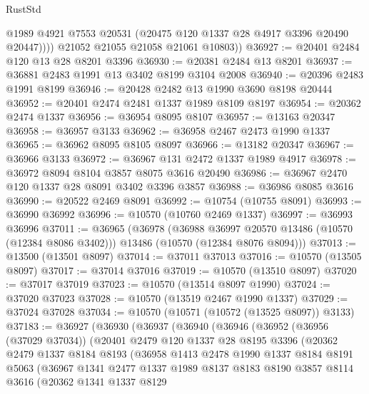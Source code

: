 \begin{lexlean}{RustStd}
\begin{coremodule}
              @1989
              @4921
              @7553
              @20531
              (@20475 @120 @1337 @28 @4917 @3396 @20490 @20447))))
        @21052
        @21055
        @21058
        @21061
        @10803))
@36927 := @20401 @2484 @120 @13 @28 @8201 @3396
@36930 := @20381 @2484 @13 @8201
@36937 := @36881 @2483 @1991 @13 @3402 @8199 @3104 @2008
@36940 := @20396 @2483 @1991 @8199
@36946 := @20428 @2482 @13 @1990 @3690 @8198 @20444
@36952 := @20401 @2474 @2481 @1337 @1989 @8109 @8197
@36954 := @20362 @2474 @1337
@36956 := @36954 @8095 @8107
@36957 := @13163 @20347
@36958 := @36957 @3133
@36962 := @36958 @2467 @2473 @1990 @1337
@36965 := @36962 @8095 @8105 @8097
@36966 := @13182 @20347
@36967 := @36966 @3133
@36972 := @36967 @131 @2472 @1337 @1989 @4917
@36978 := @36972 @8094 @8104 @3857 @8075 @3616 @20490
@36986 := @36967 @2470 @120 @1337 @28 @8091 @3402 @3396 @3857
@36988 := @36986 @8085 @3616
@36990 := @20522 @2469 @8091
@36992 := @10754 (@10755 @8091)
@36993 := @36990 @36992
@36996 := @10570 (@10760 @2469 @1337)
@36997 := @36993 @36996
@37011 := @36965
    (@36978
      (@36988 @36997 @20570 @13486 (@10570 (@12384 @8086 @3402)))
      @13486
      (@10570 (@12384 @8076 @8094)))
@37013 := @13500 (@13501 @8097)
@37014 := @37011 @37013
@37016 := @10570 (@13505 @8097)
@37017 := @37014 @37016
@37019 := @10570 (@13510 @8097)
@37020 := @37017 @37019
@37023 := @10570 (@13514 @8097 @1990)
@37024 := @37020 @37023
@37028 := @10570 (@13519 @2467 @1990 @1337)
@37029 := @37024 @37028
@37034 := @10570 (@10571 (@10572 (@13525 @8097)) @3133)
@37183 := @36927
    (@36930
      (@36937
        (@36940
          (@36946
            (@36952
              (@36956 (@37029 @37034))
              (@20401
                @2479
                @120
                @1337
                @28
                @8195
                @3396
                (@20362
                  @2479
                  @1337
                  @8184
                  @8193
                  (@36958
                    @1413
                    @2478
                    @1990
                    @1337
                    @8184
                    @8191
                    @5063
                    (@36967
                      @1341
                      @2477
                      @1337
                      @1989
                      @8137
                      @8183
                      @8190
                      @3857
                      @8114
                      @3616
                      (@20362
                        @1341
                        @1337
                        @8129

\end{coremodule}
\end{lexlean}
